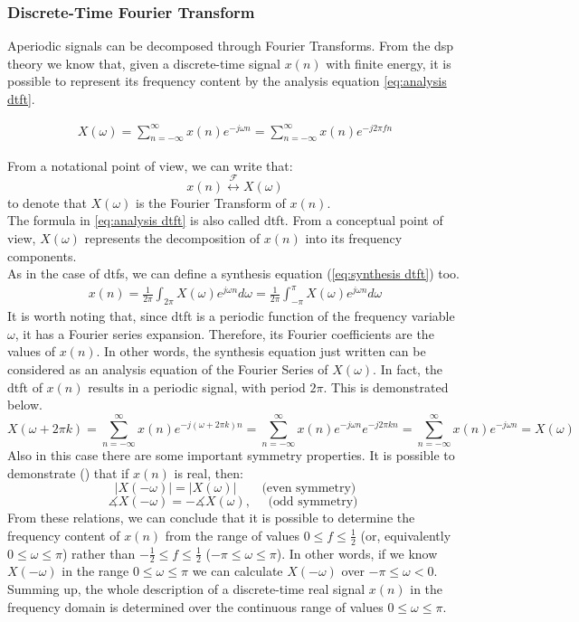 \subsubsection{Discrete-Time Fourier Transform} %
Aperiodic signals can be decomposed through Fourier Transforms. From the \gls{dsp} theory \cite{proakis2006dimitris} we know that, given a discrete-time signal $x(n)$ with finite energy, it is possible to represent its frequency content by the analysis equation \ref{eq:analysis dtft}.

\begin{align}\label{eq:analysis dtft}
X(\omega)=\sum_{n=-\infty}^{\infty} x(n) e^{-j \omega n} = \sum_{n=-\infty}^{\infty} x(n) e^{-j 2 \pi f n}
\end{align}

\noindent From a notational point of view, we can write that:
$$
x(n) \stackrel{\mathscr{F}}{\longleftrightarrow} X(\omega)
$$
to denote that $X(\omega)$ is the Fourier Transform of $x(n)$.\\
The formula in \ref{eq:analysis dtft} is also called \gls{dtft}. From a conceptual point of view, $X(\omega)$ represents the decomposition of $x(n)$ into its frequency components. \\
As in the case of \gls{dtfs}, we can define a synthesis equation (\ref{eq:synthesis dtft}) too.
\begin{align}\label{eq:synthesis dtft}
x(n)=\frac{1}{2 \pi} \int_{2 \pi} X(\omega) e^{j \omega n} d \omega = \frac{1}{2 \pi} \int_{-\pi}^{\pi} X(\omega) e^{j \omega n} d \omega 
\end{align}
\noindent It is worth noting that, since \gls{dtft} is a periodic function of the frequency variable $\omega$, it has a Fourier series expansion. Therefore, its Fourier coefficients are the values of $x(n)$. In other words, the synthesis equation just written can be considered as an analysis equation of the Fourier Series of $X(\omega)$. In fact, the \gls{dtft} of $x(n)$ results in a periodic signal, with period $2\pi$. This is demonstrated below.
$$
X(\omega+2\pi k) =\sum_{n=-\infty}^{\infty} x(n) e^{-j(\omega+2 \pi k) n} = \sum_{n=-\infty}^{\infty} x(n) e^{-j \omega n} e^{-j 2 \pi k n} =\sum_{n=-\infty}^{\infty} x(n) e^{-j \omega n}=X(\omega)
$$
\noindent Also in this case there are some important symmetry properties. It is possible to demonstrate (\cite{proakis2006dimitris}) that if $x(n)$ is real, then:
$$|X(-\omega)|=|X(\omega)| \qquad \text{(even symmetry)}
$$
$$
\measuredangle X(-\omega)=- \measuredangle X(\omega), \quad \text { (odd symmetry) }$$
From these relations, we can conclude that it is possible to determine the frequency content of $x(n)$ from the range of values $0 \leq f \leq \frac{1}{2}$ (or, equivalently $0 \leq \omega \leq \pi$) rather than $-\frac{1}{2} \leq f \leq \frac{1}{2}$ ($-\pi \leq \omega \leq \pi$). In other words, if we know $X(-\omega)$ in the range $0 \leq \omega \leq \pi$  we can calculate $X(-\omega)$ over $-\pi \leq \omega < 0$. Summing up, the whole description of a discrete-time real signal $x(n)$ in the frequency domain is determined over the continuous range of values $0 \leq \omega \leq \pi$.

